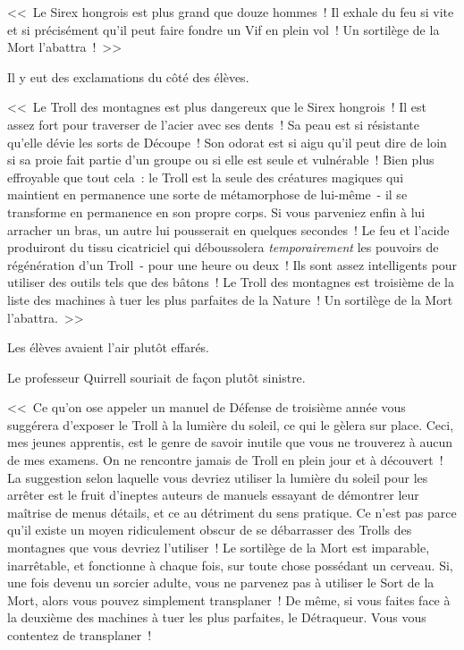 <<~Le Sirex hongrois est plus grand que douze hommes~! Il exhale du feu si vite et si précisément qu'il peut faire fondre un Vif en plein vol~! Un sortilège de la Mort l'abattra~!~>>

Il y eut des exclamations du côté des élèves.

<<~Le Troll des montagnes est plus dangereux que le Sirex hongrois~! Il est assez fort pour traverser de l'acier avec ses dents~! Sa peau est si résistante qu'elle dévie les sorts de Découpe~! Son odorat est si aigu qu'il peut dire de loin si sa proie fait partie d'un groupe ou si elle est seule et vulnérable~! Bien plus effroyable que tout cela~: le Troll est la seule des créatures magiques qui maintient en permanence une sorte de métamorphose de lui-même~- il se transforme en permanence en son propre corps. Si vous parveniez enfin à lui arracher un bras, un autre lui pousserait en quelques secondes~! Le feu et l'acide produiront du tissu cicatriciel qui déboussolera \emph{temporairement} les pouvoirs de régénération d'un Troll~- pour une heure ou deux~! Ils sont assez intelligents pour utiliser des outils tels que des bâtons~! Le Troll des montagnes est troisième de la liste des machines à tuer les plus parfaites de la Nature~! Un sortilège de la Mort l'abattra.~>>

Les élèves avaient l'air plutôt effarés.

Le professeur Quirrell souriait de façon plutôt sinistre.

<<~Ce qu'on ose appeler un manuel de Défense de troisième année vous suggérera d'exposer le Troll à la lumière du soleil, ce qui le gèlera sur place. Ceci, mes jeunes apprentis, est le genre de savoir inutile que vous ne trouverez à aucun de mes examens. On ne rencontre jamais de Troll en plein jour et à découvert~! La suggestion selon laquelle vous devriez utiliser la lumière du soleil pour les arrêter est le fruit d'ineptes auteurs de manuels essayant de démontrer leur maîtrise de menus détails, et ce au détriment du sens pratique. Ce n'est pas parce qu'il existe un moyen ridiculement obscur de se débarrasser des Trolls des montagnes que vous devriez l'utiliser~! Le sortilège de la Mort est imparable, inarrêtable, et fonctionne à chaque fois, sur toute chose possédant un cerveau. Si, une fois devenu un sorcier adulte, vous ne parvenez pas à utiliser le Sort de la Mort, alors vous pouvez simplement transplaner~! De même, si vous faites face à la deuxième des machines à tuer les plus parfaites, le Détraqueur. Vous vous contentez de transplaner~!


